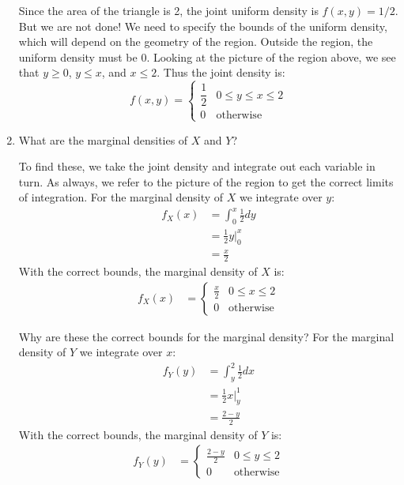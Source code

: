 \documentclass[notes.tex]{subfiles}
\begin{document}
\begin{example}
\begin{enumerate}
Since the area of the triangle is 2, the joint uniform density is $f(x, y) = 1/2$. But we are not done! We need to specify the bounds of the uniform density, which will depend on the geometry of the region. Outside the region, the uniform density must be 0. Looking at the picture of the region above, we see that $y \geq 0$, $y \leq x$, and $x \leq 2$. Thus the joint density is:
\[
f(x, y) = \begin{cases} 
      \dfrac{1}{2}  & 0 \leq y \leq x \leq 2 \\
      0 & \textrm{otherwise}
   \end{cases}
\]

\item What are the marginal densities of $X$ and $Y$?

To find these, we take the joint density and integrate out each variable in turn. As always, we refer to the picture of the region to get the correct limits of integration. For the marginal density of $X$ we integrate over $y$:
\begin{align*}
f_X(x) &= \int_0^x \frac{1}{2} dy \\
&= \frac{1}{2} y\Bigr|_0^x \\
&= \frac{x}{2}
\end{align*}
With the correct bounds, the marginal density of $X$ is:
\begin{align*}
f_X(x) &= \begin{cases}
  \frac{x}{2} & 0 \leq x \leq 2 \\
  0 & \textrm{otherwise}
   \end{cases}
\end{align*}

Why are these the correct bounds for the marginal density? For the marginal density of $Y$ we integrate over $x$:
\begin{align*}
f_Y(y) &= \int_y^2 \frac{1}{2} dx \\
&= \frac{1}{2} x\Bigr|_y^1 \\
&= \frac{2 - y}{2}
\end{align*}
With the correct bounds, the marginal density of $Y$ is:
\begin{align*}
f_Y(y) &= \begin{cases}
 \frac{2 - y}{2} & 0 \leq y \leq 2 \\
  0 & \textrm{otherwise}
   \end{cases}
\end{align*}

\end{enumerate}
\end{example}
\end{document}
